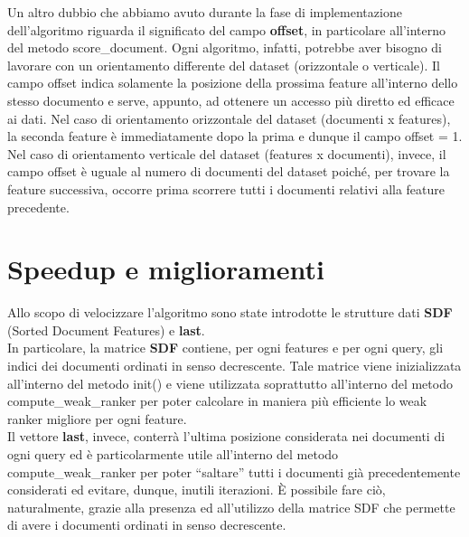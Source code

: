 Un altro dubbio che abbiamo avuto durante la fase di implementazione dell'algoritmo riguarda il significato del campo \textbf{offset}, in particolare all'interno del metodo score\_document. Ogni algoritmo, infatti, potrebbe aver bisogno di lavorare con un orientamento differente del dataset (orizzontale o verticale). Il campo offset indica solamente la posizione della prossima feature all'interno dello stesso documento e serve, appunto, ad ottenere un accesso più diretto ed efficace ai dati. Nel caso di orientamento orizzontale del dataset (documenti x features), la seconda feature è immediatamente dopo la prima e dunque il campo offset = 1. Nel caso di orientamento verticale del dataset (features x documenti), invece, il campo offset è uguale al numero di documenti del dataset poiché, per trovare la feature successiva, occorre prima scorrere tutti i documenti relativi alla feature precedente.\\

	\section*{Speedup e miglioramenti}
Allo scopo di velocizzare l'algoritmo sono state introdotte le strutture dati \textbf{SDF} (Sorted Document Features) e \textbf{last}.\\
In particolare, la matrice \textbf{SDF} contiene, per ogni features e per ogni query, gli indici dei documenti ordinati in senso decrescente. Tale matrice viene inizializzata all'interno del metodo init() e viene utilizzata soprattutto all'interno del metodo compute\_weak\_ranker per poter calcolare in maniera più efficiente lo weak ranker migliore per ogni feature.\\
Il vettore \textbf{last}, invece, conterrà l'ultima posizione considerata nei documenti di ogni query ed è particolarmente utile all'interno del metodo compute\_weak\_ranker per poter ``saltare'' tutti i documenti già precedentemente considerati ed evitare, dunque, inutili iterazioni. È possibile fare ciò, naturalmente, grazie alla presenza ed all'utilizzo della matrice SDF che permette di avere i documenti ordinati in senso decrescente.

	
	
